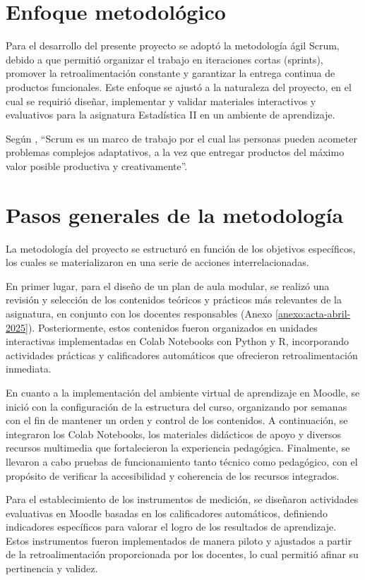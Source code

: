 \documentclass[letter,oneside,12pt,spanish]{report}
\begin{document}
\section{Enfoque metodológico}

Para el desarrollo del presente proyecto se adoptó la metodología ágil Scrum, debido a que permitió organizar el trabajo en iteraciones cortas (sprints), promover la retroalimentación constante y garantizar la entrega continua de productos funcionales. Este enfoque se ajustó a la naturaleza del proyecto, en el cual se requirió diseñar, implementar y validar materiales interactivos y evaluativos para la asignatura Estadística II en un ambiente de aprendizaje.

Según \cite{schwaber2013scrum}, ``Scrum es un marco de trabajo por el cual las personas pueden acometer problemas complejos adaptativos, a la vez que entregar productos del máximo valor posible productiva y creativamente''.

\section{Pasos generales de la metodología}

La metodología del proyecto se estructuró en función de los objetivos específicos, los cuales se materializaron en una serie de acciones interrelacionadas.

En primer lugar, para el diseño de un plan de aula modular, se realizó una revisión y selección de los contenidos teóricos y prácticos más relevantes de la asignatura, en conjunto con los docentes responsables (Anexo \ref{anexo:acta-abril-2025}). Posteriormente, estos contenidos fueron organizados en unidades interactivas implementadas en Colab Notebooks con Python y R, incorporando actividades prácticas y calificadores automáticos que ofrecieron retroalimentación inmediata.

En cuanto a la implementación del ambiente virtual de aprendizaje en Moodle, se inició con la configuración de la estructura del curso, organizando por semanas con el fin de mantener un orden y control de los contenidos. A continuación, se integraron los Colab Notebooks, los materiales didácticos de apoyo y diversos recursos multimedia que fortalecieron la experiencia pedagógica. Finalmente, se llevaron a cabo pruebas de funcionamiento tanto técnico como pedagógico, con el propósito de verificar la accesibilidad y coherencia de los recursos integrados.

Para el establecimiento de los instrumentos de medición, se diseñaron actividades evaluativas en Moodle basadas en los calificadores automáticos, definiendo indicadores específicos para valorar el logro de los resultados de aprendizaje. Estos instrumentos fueron implementados de manera piloto y ajustados a partir de la retroalimentación proporcionada por los docentes, lo cual permitió afinar su pertinencia y validez.
\end{document}
